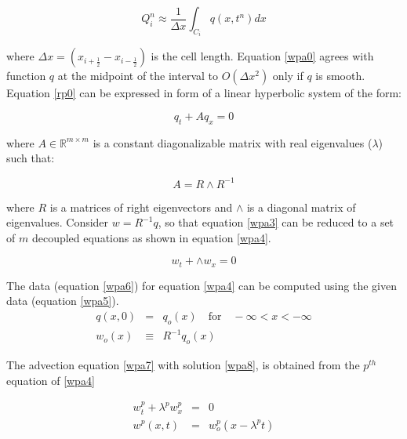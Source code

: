 \documentclass[12pt,a4paper]{article}
\begin{document}
    \begin{equation}
    	Q_{i}^{n} \approx \dfrac{1}{\Delta x} \int_{C_{i}}q(x,t^{n})dx
    	\label{wpa0}
    \end{equation}
    
   \noindent  where  $\Delta x = (x_{i+\frac{1}{2}} - x_{i-\frac{1}{2}})$ is the cell length. Equation \eqref{wpa0} agrees with function $q$ at the midpoint of the interval to $O(\Delta x^{2})$ only if  $q$ is smooth.\\
   
  \noindent  Equation \eqref{rp0} can be expressed in form of a linear hyperbolic system of the form:
   
   \begin{equation}
   		q_{t} + Aq_{x} = 0
   		\label{wpa3}
   \end{equation}

	\noindent where $A \in \mathbb{R}^{m\times m}$ is a constant diagonalizable matrix with real eigenvalues ($\lambda$) such that:

	\begin{equation}
	A = R \wedge R^{-1}
	\end{equation}
   
  \noindent where $R$ is a matrices of right eigenvectors and  $\wedge$  is a diagonal matrix of eigenvalues. Consider $w = R^{-1}q$, so that equation \eqref{wpa3} can be reduced to a set of $m$ decoupled equations as shown in equation \eqref{wpa4}.
  
  \begin{equation}
  	w_{t} + \wedge w_{x} = 0
  	\label{wpa4}
  \end{equation}
  
  \noindent The  data (equation \eqref{wpa6}) for equation \eqref{wpa4} can be computed using the given data (equation \eqref{wpa5}).
  \begin{eqnarray}
  	q(x,0)& =& q_{o} (x) \quad \text{for} \quad - \infty < x < - \infty 
  	\label{wpa5}\\
  	w_{o} (x) &\equiv& R^{-1} q_{o}(x)
  	\label{wpa6}
  \end{eqnarray}
  
  \noindent The advection equation \eqref{wpa7} with solution \eqref{wpa8}, is obtained from the $p^{th}$ equation of \eqref{wpa4}
  
  
  \begin{eqnarray}
  	w_{t}^{p} + \lambda^{p} w_{x}^{p} &=& 0
  	\label{wpa7}\\
  	w^{p} (x,t) &=& w_{o}^{p} (x-\lambda^{p}t)
  		\label{wpa8}
  \end{eqnarray}
   
\end{document}
